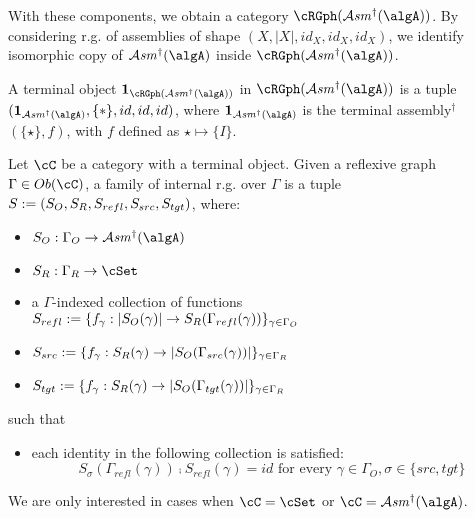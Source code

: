 \documentclass[12pt,a4paper]{article}
\def\cAsm{\mathcal{A}\mathit{sm}^\dagger}
\def\src{_{src}}\alwaysmath{src}
\def\rfl{_{refl}}\alwaysmath{rfl}
\def\tgt{_{tgt}}\alwaysmath{tgt}
\renewcommand{\O}{_{O}}
\newcommand{\R}{\ensuremath{_{R}}}
\begin{document}
With these components, we obtain a category $\cRGph(\cAsm(\algA))$. By considering r.g. of assemblies of shape $(X,|X|,id_X,id_X,id_X)$, we identify isomorphic copy of $\cAsm(\algA)$ inside $\cRGph(\cAsm(\algA))$.

A terminal object $\mathbf{1}_{\cRGph(\cAsm(\algA))}$ in $\cRGph(\cAsm(\algA))$ is a tuple $(\mathbf{1}_{\cAsm(\algA)}, \{*\}, id, id, id)$, where $\mathbf{1}_{\cAsm(\algA)}$ is the terminal assembly$^\dagger$ $(\{\star\},f)$, with $f$ defined as $\star \mapsto \{I\}$.

\begin{definition}
  \label{def:fam-refl-graphs}
  Let $\cC$ be a category with a terminal object. Given a reflexive graph $\Gamma \in \ob\cC$, a family of internal r.g. over $\Gamma$ is a tuple $S\define(S_O, S_R, S\rfl, S\src, S\tgt)$, where:
  \begin{itemize}[noitemsep]
    \item $S\O : \Gamma\O \to \cAsm(\algA)$
    \item $S\R : \Gamma\R \to \cSet$
    \item a $\Gamma$-indexed collection of functions $S\rfl \define \{f_\gamma : \carr{S\O(\gamma)} \to S\R(\Gamma\rfl(\gamma)) \}_{\gamma \in \Gamma\O}$
    \item $S\src \define \{f_\gamma : S\R(\gamma) \to \carr{S\O(\Gamma\src(\gamma))} \}_{\gamma \in \Gamma\R}$
    \item $S\tgt \define \{f_\gamma : S\R(\gamma) \to \carr{S\O(\Gamma\tgt(\gamma))} \}_{\gamma \in \Gamma\R}$ 
  \end{itemize}
  such that 
  \begin{itemize}[noitemsep]
    \item each identity in the following collection is satisfied:
     $$S_\sigma(\Gamma\rfl(\gamma)) \comp S\rfl(\gamma) = id \text{ for every } \gamma \in \Gamma\O, \sigma \in \{src, tgt \}$$
  \end{itemize}

\end{definition}
We are only interested in cases when $\cC = \cSet$ or $\cC = \cAsm(\algA)$. 
\end{document}

